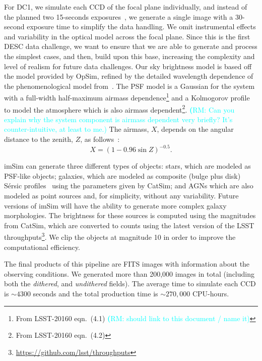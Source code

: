 \documentclass[twocolumn]{aastex62}
\newcommand{\rachel}[1]{{\textcolor{cyan}{{\textbf (RM: #1)}}}}
\begin{document}
For DC1, we simulate each CCD of the focal plane individually, and instead of the planned two 15-seconds exposures~\citep{Overview}, we generate a single image with a 30-second exposure time to simplify the data handling. We omit instrumental effects and variability in the optical model across the focal plane. Since this is the first DESC data challenge, we want to ensure that we are able to generate and process the simplest cases, and then, build upon this base, increasing the complexity and level of realism for future data challenges. Our sky brightness model is based off the \citet{1991PASP..103.1033K} model provided by OpSim, refined by the detailed wavelength dependence of the phenomenological model from~\citet{2016SPIE.9910E..1AY}. The PSF model is a Gaussian for the system with a full-width half-maximum airmass dependence\footnote{From LSST-20160 eqn.~(4.1) \rachel{should link to this document / name it}} and a Kolmogorov profile to model the atmosphere which is also airmass dependent\footnote{From LSST-20160 eqn.~(4.2)}. \rachel{Can you explain why the system component is airmass dependent very briefly?  It's counter-intuitive, at least to me.} The airmass, $X$, depends on the angular distance to the zenith, $Z$, as follows~\citep{1991PASP..103.1033K}:
\begin{equation}
X = (1 - 0.96\sin{Z})^{-0.5}.
\end{equation}

imSim can generate three different types of objects: stars, which are modeled as PSF-like objects; galaxies, which are modeled as composite (bulge plus disk) S\'{e}rsic profiles~\citep{1963BAAA....6...41S} using
the parameters given by CatSim; and AGNs which are also modeled as point sources and, for simplicity, without any variability. Future versions of imSim will have the ability to generate more complex galaxy morphologies. The brightness for these sources is computed using the magnitudes from CatSim, which are converted to counts using the latest version of the LSST throughputs\footnote{\url{https://github.com/lsst/throughputs}}. We clip the objects at magnitude 10 in order to improve the computational efficiency.

The final products of this pipeline are FITS images with information about the observing conditions. We generated more than 200,000 images in total (including both the \textit{dithered}, and \textit{undithered} fields). The average time to simulate each CCD is $\sim 4300$ seconds and the total production time is $\sim 270,000$ CPU-hours.
\end{document}
